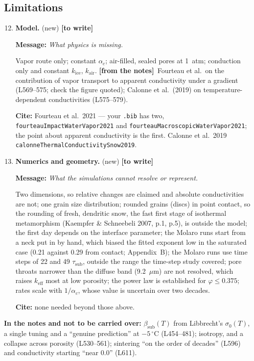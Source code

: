 \documentclass[11pt]{article}
\newcommand{\Miss}{\textcolor{miss}{\textbf{[to write]}}\ }
\newcommand{\Note}{\textcolor{open}{\textbf{[from the notes]}}\ }
\newcommand{\Cite}[1]{\par{\footnotesize\raggedright\textcolor{have}{\textbf{Cite:}} #1\par}}
\newcommand{\Msg}[1]{\par\textcolor{open}{\textbf{Message:}} \textit{#1}\par}
\newcommand{\New}[1]{\textbf{#1} \textnormal{\small(new)}}
\begin{document}
\subsection{Limitations}
\begin{enumerate}
\setcounter{enumi}{11}
\item \New{Model.} \Miss
  \Msg{What physics is missing.}
  Vapor route only; constant $\alpha_c$; air-filled,
  sealed pores at 1~atm; conduction only and constant $k_{\mathrm{ice}}$,
  $k_{\mathrm{air}}$. \Note Fourteau et al.\ on the contribution of vapor
  transport to apparent conductivity under a gradient (L569--575; check the
  figure quoted); Calonne et al.\ (2019) on temperature-dependent
  conductivities (L575--579).
  \Cite{Fourteau et al.\ 2021 --- your \texttt{.bib} has two, \texttt{fourteauImpactWaterVapor2021} and \texttt{fourteauMacroscopicWaterVapor2021}; the point about apparent conductivity is the first. Calonne et al.\ 2019 \texttt{calonneThermalConductivitySnow2019}.}
\item \New{Numerics and geometry.} \Miss
  \Msg{What the simulations cannot resolve or represent.}
  Two dimensions, so relative
  changes are claimed and absolute conductivities are not; one grain size
  distribution; rounded grains (discs) in point contact, so the rounding
  of fresh, dendritic snow, the fast first stage of isothermal
  metamorphism (Kaempfer \& Schneebeli 2007, p.1, p.5), is outside the
  model; the first day depends on the interface parameter; the Molaro
  runs start from a neck put in by hand, which biased the fitted exponent
  low in the saturated case (0.21 against 0.29 from contact; Appendix~B); the Molaro runs use time steps of 22 and 49
  $\tau_{\mathrm{sub}}$, outside the range the time-step study covered; pore
  throats narrower than the diffuse band (9.2~$\mu$m) are not resolved,
  which raises $k_{\mathrm{eff}}$ most at low porosity; the power law is
  established for $\varphi \le 0.375$; rates scale with $1/\alpha_c$, whose
  value is uncertain over two decades.
  \Cite{none needed beyond those above.}
\end{enumerate}

\textbf{In the notes and not to be carried over:} $\beta_{\mathrm{sub}}(T)$
from Libbrecht's $\sigma_0(T)$, a single tuning and a ``genuine prediction''
at $-5\,^{\circ}$C (L454--481); isotropy, and a collapse across porosity
(L530--561); sintering ``on the order of decades'' (L596) and conductivity
starting ``near 0.0'' (L611).
\end{document}
